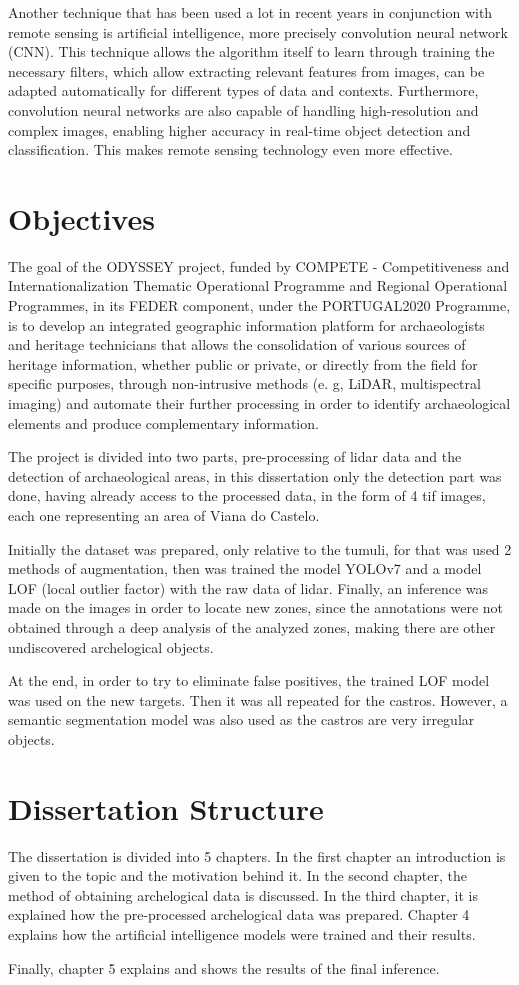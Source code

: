Another technique that has been used a lot in recent years in conjunction with remote sensing is artificial intelligence, more precisely convolution neural network (CNN). This technique allows the algorithm itself to learn through training the necessary filters, which allow extracting relevant features from images, can be adapted automatically for different types of data and contexts. Furthermore, convolution neural networks are also capable of handling high-resolution and complex images, enabling higher accuracy in real-time object detection and classification. This makes remote sensing technology even more effective.


\section{Objectives}
The goal of the ODYSSEY project, funded by COMPETE - Competitiveness and Internationalization Thematic Operational Programme and Regional Operational Programmes, in its FEDER component, under the PORTUGAL2020 Programme, is to develop an integrated geographic information platform for archaeologists and heritage technicians that allows the consolidation of various sources of heritage information, whether public or private, or directly from the field for specific purposes, through non-intrusive methods (e. g, LiDAR, multispectral imaging) and automate their further processing in order to identify archaeological elements and produce complementary information.

The project is divided into two parts, pre-processing of lidar data and the detection of archaeological areas, in this dissertation only the detection part was done, having already access to the processed data, in the form of 4 tif images, each one representing an area of Viana do Castelo.

Initially the dataset was prepared, only relative to the tumuli, for that was used 2 methods of augmentation, then was trained the model YOLOv7 and a model LOF (local outlier factor) with the raw data of lidar.
Finally, an inference was made on the images in order to locate new zones, since the annotations were not obtained through a deep analysis of the analyzed zones, making there are other undiscovered archelogical objects.

At the end, in order to try to eliminate false positives, the trained LOF model was used on the new targets.
Then it was all repeated for the castros. However, a semantic segmentation model was also used as the castros are very irregular objects.

\section{Dissertation Structure}
The dissertation is divided into 5 chapters. In the first chapter an introduction is given to the topic and the motivation behind it. In the second chapter, the method of obtaining archelogical data is discussed. In the third chapter, it is explained how the pre-processed archelogical data was prepared. Chapter 4 explains how the artificial intelligence models were trained and their results.

Finally, chapter 5 explains and shows the results of the final inference.
